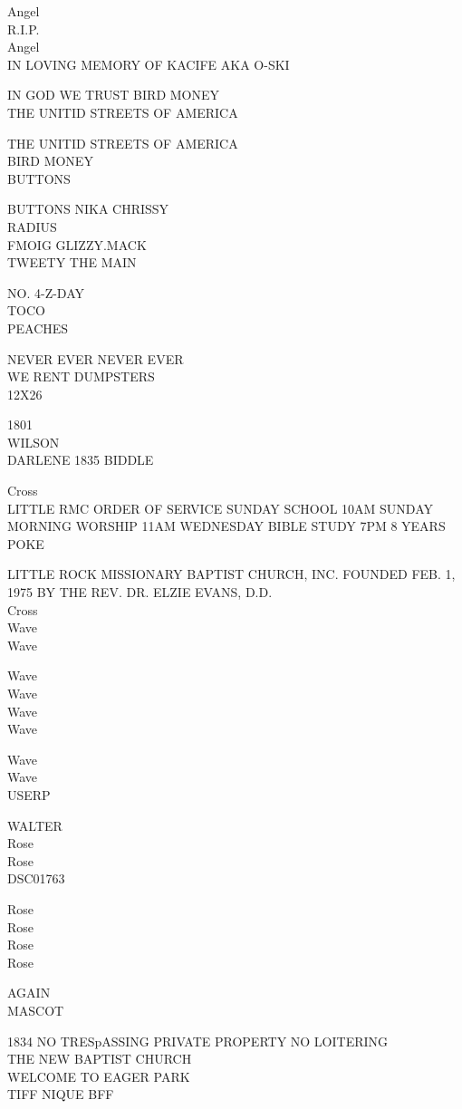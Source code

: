 \documentclass[10pt,letterpaper]{article}
\begin{document}
Angel\\
R.I.P.\\
Angel\\
IN LOVING MEMORY OF KACIFE AKA O{-}SKI

IN GOD WE TRUST BIRD MONEY\\
THE UNITID STREETS OF AMERICA

THE UNITID STREETS OF AMERICA\\
BIRD MONEY\\
BUTTONS

BUTTONS NIKA CHRISSY\\
RADIUS\\
FMOIG GLIZZY.MACK\\
TWEETY THE MAIN

NO. 4{-}Z{-}DAY\\
TOCO\\
PEACHES

NEVER EVER NEVER EVER\\
WE RENT DUMPSTERS\\
12X26

1801\\
WILSON\\
DARLENE 1835 BIDDLE

Cross\\
LITTLE RMC ORDER OF SERVICE SUNDAY SCHOOL 10AM SUNDAY MORNING WORSHIP 11AM WEDNESDAY BIBLE STUDY 7PM 8 YEARS\\
POKE

LITTLE ROCK MISSIONARY BAPTIST CHURCH, INC. FOUNDED FEB. 1, 1975 BY THE REV. DR. ELZIE EVANS, D.D.\\
Cross\\
Wave\\
Wave

Wave\\
Wave\\
Wave\\
Wave

Wave\\
Wave\\
USERP

WALTER\\
Rose\\
Rose\\
DSC01763

Rose\\
Rose\\
Rose\\
Rose

AGAIN\\
MASCOT

1834 NO TRESpASSING PRIVATE PROPERTY NO LOITERING\\
THE NEW BAPTIST CHURCH\\
WELCOME TO EAGER PARK\\
TIFF NIQUE BFF
\end{document}
